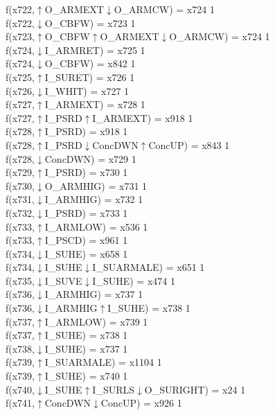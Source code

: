 f(x722,$\uparrow$O\_ARMEXT$\downarrow$O\_ARMCW) = x724 {1} \\
f(x722,$\downarrow$O\_CBFW) = x723 {1} \\
f(x723,$\uparrow$O\_CBFW$\uparrow$O\_ARMEXT$\downarrow$O\_ARMCW) = x724 {1} \\
f(x724,$\downarrow$I\_ARMRET) = x725 {1} \\
f(x724,$\downarrow$O\_CBFW) = x842 {1} \\
f(x725,$\uparrow$I\_SURET) = x726 {1} \\
f(x726,$\downarrow$I\_WHIT) = x727 {1} \\
f(x727,$\uparrow$I\_ARMEXT) = x728 {1} \\
f(x727,$\uparrow$I\_PSRD$\uparrow$I\_ARMEXT) = x918 {1} \\
f(x728,$\uparrow$I\_PSRD) = x918 {1} \\
f(x728,$\uparrow$I\_PSRD$\downarrow$ConcDWN$\uparrow$ConcUP) = x843 {1} \\
f(x728,$\downarrow$ConcDWN) = x729 {1} \\
f(x729,$\uparrow$I\_PSRD) = x730 {1} \\
f(x730,$\downarrow$O\_ARMHIG) = x731 {1} \\
f(x731,$\downarrow$I\_ARMHIG) = x732 {1} \\
f(x732,$\downarrow$I\_PSRD) = x733 {1} \\
f(x733,$\uparrow$I\_ARMLOW) = x536 {1} \\
f(x733,$\uparrow$I\_PSCD) = x961 {1} \\
f(x734,$\downarrow$I\_SUHE) = x658 {1} \\
f(x734,$\downarrow$I\_SUHE$\downarrow$I\_SUARMALE) = x651 {1} \\
f(x735,$\downarrow$I\_SUVE$\downarrow$I\_SUHE) = x474 {1} \\
f(x736,$\downarrow$I\_ARMHIG) = x737 {1} \\
f(x736,$\downarrow$I\_ARMHIG$\uparrow$I\_SUHE) = x738 {1} \\
f(x737,$\uparrow$I\_ARMLOW) = x739 {1} \\
f(x737,$\uparrow$I\_SUHE) = x738 {1} \\
f(x738,$\downarrow$I\_SUHE) = x737 {1} \\
f(x739,$\uparrow$I\_SUARMALE) = x1104 {1} \\
f(x739,$\uparrow$I\_SUHE) = x740 {1} \\
f(x740,$\downarrow$I\_SUHE$\uparrow$I\_SURLS$\downarrow$O\_SURIGHT) = x24 {1} \\
f(x741,$\uparrow$ConcDWN$\downarrow$ConcUP) = x926 {1} \\
